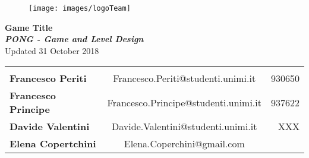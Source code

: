 \documentclass[12pt]{report}
\begin{document}
\begin{center}
  \begin{figure}
    \centering
  \vspace*{5\baselineskip}
  \texttt{[image: images/logoTeam]}
  \end{figure}

  {\large \textbf{Game Title}} \\
  \textbf{\textit{PONG - Game and Level Design}} \\
  {\small Updated 31 October 2018} \\

\begin{tabular}{lcr}\\\\
\textbf{Francesco Periti}    & Francesco.Periti@studenti.unimi.it   & 930650\\
\textbf{Francesco Principe}  & Francesco.Principe@studenti.unimi.it & 937622\\
\textbf{Davide Valentini}    & Davide.Valentini@studenti.unimi.it   & XXX\\
\textbf{Elena Copertchini}   & Elena.Coperchini@gmail.com &\\
\end{tabular}

\end{center}







  
\end{document}
